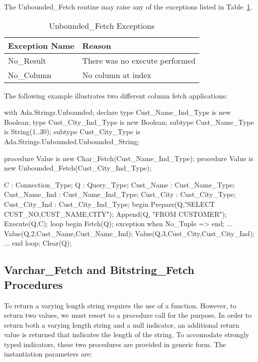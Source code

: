 \documentclass[english,letterpaper]{book}
\begin{document}
The Unbounded\_Fetch routine may raise any of the exceptions listed in Table~\ref{t:ufx}.

\begin{table}
   \begin{center}
      \begin{tabular}{ll}
         Exception Name    &  Reason\\
         \hline 
         No\_Result        &  There was no execute performed\\
         No\_Column        &  No column at index\\
      \end{tabular}
   \end{center}
   \caption{Unbounded\_Fetch Exceptions}\label{t:ufx}
\end{table}

The following example illustrates two different column fetch applications:

\begin{Example}
with Ada.Strings.Unbounded;
declare
   type Cust_Name_Ind_Type is new Boolean;
   type Cust_City_Ind_Type is new Boolean;
   subtype Cust_Name_Type is String(1..30);
   subtype Cust_City_Type is
       Ada.Strings.Unbounded.Unbounded_String;

   procedure Value is new 
       Char_Fetch(Cust_Name_Ind_Type);
   procedure Value is new 
       Unbounded_Fetch(Cust_City_Ind_Type);

   C :             Connection_Type;
   Q :             Query_Type;
   Cust_Name :     Cust_Name_Type;
   Cust_Name_Ind : Cust_Name_Ind_Type;
   Cust_City :     Cust_City_Type;
   Cust_City_Ind : Cust_City_Ind_Type;
begin
   Prepare(Q,"SELECT CUST_NO,CUST_NAME,CITY");
   Append(Q, "FROM CUSTOMER");
   Execute(Q,C);
   loop
      begin
         Fetch(Q);
      exception
         when No_Tuple =>
      end;
      ...
      Value(Q,2,Cust_Name,Cust_Name_Ind);
      Value(Q,3,Cust_City,Cust_City_Ind);
      ...
   end loop;
   Clear(Q);
\end{Example}

\subsection{Varchar\_Fetch and Bitstring\_Fetch Procedures}

To return a varying length string requires
the use of a function. However, to return two values, we must resort
to a procedure call for the purpose. In order to return both a varying
length string and a null indicator, an additional return value is
returned that indicates the length of the string. To accomodate strongly
typed indicators, these two procedures are provided in generic form.
The instantiation parameters are:
\end{document}
